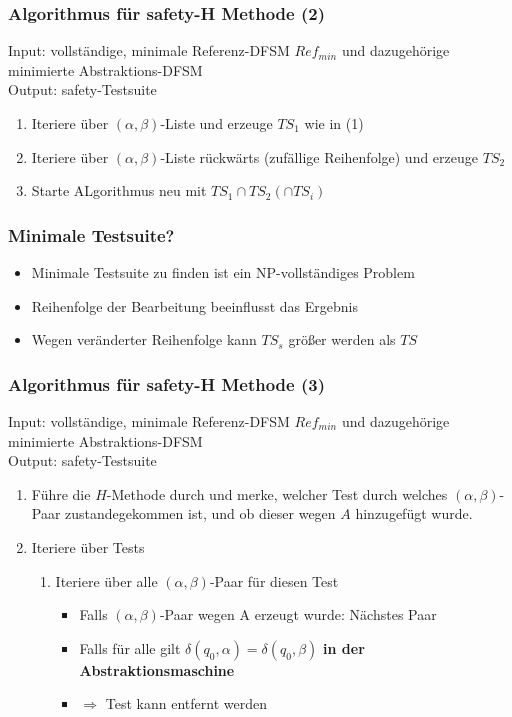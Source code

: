     \begin{frame}
    \frametitle{Algorithmus für safety-H Methode (2)}
    Input: vollständige, minimale Referenz-DFSM $Ref_{min}$ und dazugehörige minimierte Abstraktions-DFSM\\
    Output: safety-Testsuite
    \begin{enumerate}
      \item Iteriere über $(\alpha,\beta)$-Liste und erzeuge $TS_1$ wie in (1)
      \item Iteriere über $(\alpha,\beta)$-Liste rückwärts (zufällige Reihenfolge) und erzeuge $TS_2$
      \item Starte ALgorithmus neu mit $TS_1 \cap TS_2 (\cap TS_i)$
    \end{enumerate}
    \end{frame}
    
    \begin{frame}
    \frametitle{Minimale Testsuite?}
    \begin{itemize}
      \item Minimale Testsuite zu finden ist ein NP-vollständiges Problem
      \item Reihenfolge der Bearbeitung beeinflusst das Ergebnis
      \item Wegen veränderter Reihenfolge kann $TS_s$ größer werden als $TS$
    \end{itemize}
    \end{frame}
    
    \begin{frame}
    \frametitle{Algorithmus für safety-H Methode (3)}
    Input: vollständige, minimale Referenz-DFSM $Ref_{min}$ und dazugehörige minimierte Abstraktions-DFSM\\
    Output: safety-Testsuite
    \begin{enumerate}
      \item Führe die $H$-Methode durch und merke, welcher Test durch welches $(\alpha,\beta)$-Paar zustandegekommen ist, und ob dieser wegen $A$ hinzugefügt wurde.
      \item Iteriere über Tests
      \begin{enumerate}
        \item Iteriere über alle $(\alpha,\beta)$-Paar für diesen Test\\
        \begin{itemize}
          \item[] Falls $(\alpha,\beta)$-Paar wegen A erzeugt wurde: Nächstes Paar
          \item[] Falls für alle gilt $\delta(q_0,\alpha) = \delta(q_0,\beta)$ \textbf{in der Abstraktionsmaschine}
          \item[] $\Rightarrow$ Test kann entfernt werden
    
        \end{itemize}
      \end{enumerate}
    \end{enumerate}
    \end{frame}
    